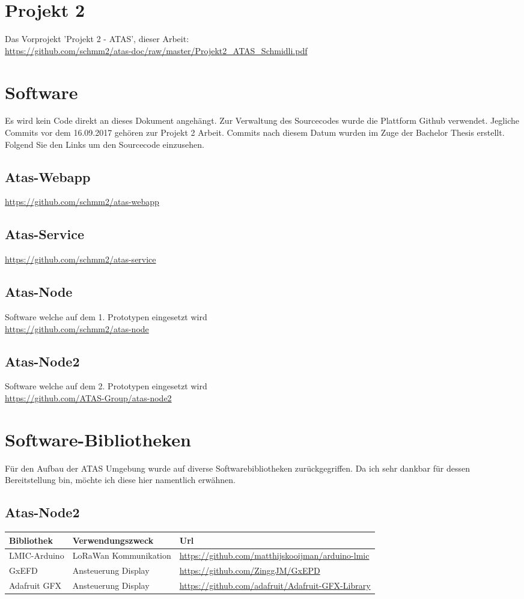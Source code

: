 \documentclass[11pt,english,german]{report}
\theoremstyle{definition}
\begin{document}
\section{Projekt 2}
Das Vorprojekt 'Projekt 2 - ATAS', dieser Arbeit:\\ \url{https://github.com/schmm2/atas-doc/raw/master/Projekt2_ATAS_Schmidli.pdf}
\section{Software}
Es wird kein Code direkt an dieses Dokument angehängt. Zur Verwaltung des Sourcecodes wurde die Plattform Github verwendet. Jegliche Commits vor dem 16.09.2017 gehören zur Projekt 2 Arbeit. Commits nach diesem Datum wurden im Zuge der Bachelor Thesis erstellt. 
Folgend Sie den Links um den Sourcecode einzusehen.
\subsection{Atas-Webapp}
\url{https://github.com/schmm2/atas-webapp}
\subsection{Atas-Service}
\url{https://github.com/schmm2/atas-service}
\subsection{Atas-Node}
Software welche auf dem 1. Prototypen eingesetzt wird\\
\url{https://github.com/schmm2/atas-node}
\subsection{Atas-Node2}
Software welche auf dem 2. Prototypen eingesetzt wird\\
\url{https://github.com/ATAS-Group/atas-node2}

\newpage
\section{Software-Bibliotheken}
Für den Aufbau der ATAS Umgebung wurde auf diverse Softwarebibliotheken zurückgegriffen. Da ich sehr dankbar für dessen Bereitstellung bin, möchte ich diese hier namentlich erwähnen.

\subsection{Atas-Node2}
\begin{tabularx}{\linewidth}{llX}
	\textbf{Bibliothek} & \textbf{Verwendungszweck} & \textbf{Url} \\ \hline
	LMIC-Arduino & LoRaWan Kommunikation & \url{https://github.com/matthijskooijman/arduino-lmic}\\ \hline
	GxEFD & Ansteuerung Display & \url{https://github.com/ZinggJM/GxEPD}\\ \hline
	Adafruit GFX & Ansteuerung Display & \url{https://github.com/adafruit/Adafruit-GFX-Library}\\ \hline
\end{tabularx}
\end{document}
